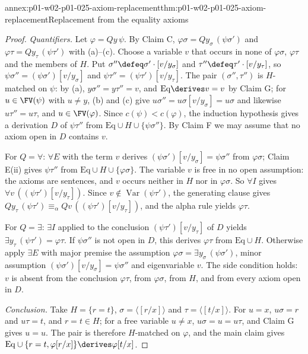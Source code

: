 \begin{annexitem}{annex:p01-w02-p01-025-axiom-replacement}{thm:p01-w02-p01-025-axiom-replacement}{Replacement from the equality axioms}
\begin{proof}
\emph{Quantifiers.}  Let \(\varphi=Qy\,\psi\).  By Claim C,
\(\varphi\sigma=Qy_\sigma\,(\psi\sigma')\) and
\(\varphi\tau=Qy_\tau\,(\psi\tau')\) with (a)--(c).  Choose a variable \(v\)
that occurs in none of \(\varphi\sigma\), \(\varphi\tau\) and the members of
\(H\).  Put \(\sigma''\defeq\sigma'\cdot[v/y_\sigma]\) and
\(\tau''\defeq\tau'\cdot[v/y_\tau]\), so
\(\psi\sigma''=(\psi\sigma')[v/y_\sigma]\) and
\(\psi\tau''=(\psi\tau')[v/y_\tau]\).  The pair \((\sigma'',\tau'')\) is
\(H\)-matched on \(\psi\): by (a), \(y\sigma''=y\tau''=v\), and
\(\mathrm{Eq}\derives v=v\) by Claim G; for \(u\in\FV(\psi)\) with
\(u\ne y\), (b) and (c) give \(u\sigma''=u\sigma[v/y_\sigma]=u\sigma\) and
likewise \(u\tau''=u\tau\), and \(u\in\FV(\varphi)\).  Since
\(c(\psi)<c(\varphi)\), the induction hypothesis gives a derivation \(D\) of
\(\psi\tau''\) from \(\mathrm{Eq}\cup H\cup\{\psi\sigma''\}\).  By Claim F we
may assume that no axiom open in \(D\) contains \(v\).

For \(Q=\forall\): \(\forall E\) with the term \(v\) derives
\((\psi\sigma')[v/y_\sigma]=\psi\sigma''\) from \(\varphi\sigma\); Claim E(ii)
gives \(\psi\tau''\) from \(\mathrm{Eq}\cup H\cup\{\varphi\sigma\}\).  The
variable \(v\) is free in no open assumption: the axioms are sentences, and
\(v\) occurs neither in \(H\) nor in \(\varphi\sigma\).  So \(\forall I\)
gives \(\forall v\,((\psi\tau')[v/y_\tau])\).  Since
\(v\notin\operatorname{Var}(\psi\tau')\), the generating clause gives
\(Qy_\tau\,(\psi\tau')\equiv_\alpha Qv\,((\psi\tau')[v/y_\tau])\), and the
alpha rule yields \(\varphi\tau\).

For \(Q=\exists\): \(\exists I\) applied to the conclusion
\((\psi\tau')[v/y_\tau]\) of \(D\) yields \(\exists y_\tau\,(\psi\tau')=
\varphi\tau\).  If \(\psi\sigma''\) is not open in \(D\), this derives
\(\varphi\tau\) from \(\mathrm{Eq}\cup H\).  Otherwise apply \(\exists E\)
with major premise the assumption
\(\varphi\sigma=\exists y_\sigma\,(\psi\sigma')\), minor assumption
\((\psi\sigma')[v/y_\sigma]=\psi\sigma''\) and eigenvariable \(v\).  The
side condition holds: \(v\) is absent from the conclusion \(\varphi\tau\),
from \(\varphi\sigma\), from \(H\), and from every axiom open in \(D\).

\emph{Conclusion.}  Take \(H=\{r=t\}\), \(\sigma=\langle[r/x]\rangle\) and
\(\tau=\langle[t/x]\rangle\).  For \(u=x\), \(u\sigma=r\) and \(u\tau=t\),
and \(r=t\in H\); for a free variable \(u\ne x\), \(u\sigma=u=u\tau\), and
Claim G gives \(u=u\).  The pair is therefore \(H\)-matched on \(\varphi\),
and the main claim gives
\(\mathrm{Eq}\cup\{r=t,\varphi[r/x]\}\derives\varphi[t/x]\).
\end{proof}
\end{annexitem}

